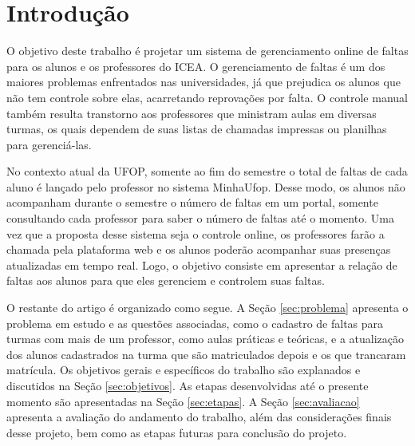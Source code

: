 \documentclass[
  12pt,       %
  openright,      %
  oneside,      %
  a4paper,      %
  english,      %
  french,        %
  spanish,     %
  brazil        %
  ]{abntex2-decsi}
\begin{document}

\tableofcontents*
\cleardoublepage

\textual

\chapter[Introdução]{Introdução}
O objetivo deste trabalho é projetar um sistema de gerenciamento online de faltas para os alunos e os professores do ICEA. O gerenciamento de faltas é um dos maiores problemas enfrentados nas universidades, já que prejudica os alunos que não tem controle sobre elas, acarretando reprovações por falta. O controle manual também resulta transtorno aos professores que ministram aulas em diversas turmas, os quais dependem de suas listas de chamadas impressas ou planilhas para gerenciá-las.

No contexto atual da UFOP, somente ao fim do semestre o total de faltas de cada aluno é lançado pelo professor no sistema MinhaUfop. Desse modo, os alunos não acompanham durante o semestre o número de faltas em um portal, somente consultando cada professor para saber o número de faltas até o momento. Uma vez que a proposta desse sistema seja o controle online, os professores farão a chamada pela plataforma web e os alunos poderão acompanhar suas presenças atualizadas em tempo real. Logo, o objetivo consiste em apresentar a relação de faltas aos alunos para que eles gerenciem e controlem suas faltas.

O restante do artigo é organizado como segue. A Seção \ref{sec:problema} apresenta o problema em estudo e as questões associadas, como o cadastro de faltas para turmas com mais de um professor, como aulas práticas e teóricas, e a atualização dos alunos cadastrados na turma que são matriculados depois e os que trancaram matrícula. Os objetivos gerais e específicos do trabalho são explanados e discutidos na Seção \ref{sec:objetivos}. As etapas desenvolvidas até o presente momento são apresentadas na Seção \ref{sec:etapas}. A Seção \ref{sec:avaliacao} apresenta a avaliação do andamento do trabalho, além das considerações finais desse projeto, bem como as etapas futuras para conclusão do projeto.
%
\end{document}
